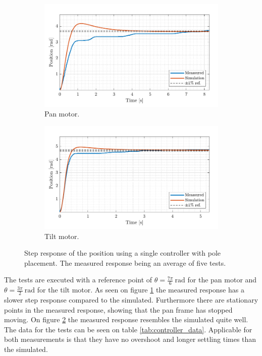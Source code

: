 \documentclass[../../main.tex]{subfiles}
\begin{document}
\begin{figure}[h]
     \centering
     \begin{subfigure}[b]{0.49\textwidth}
         \centering
         \includegraphics[width=\textwidth]{Sections/Test/Images/PoscontrollerTestPan.pdf}
         \caption{Pan motor.}
         \label{fig:StepPanPos}
     \end{subfigure}
     \hfill
     \begin{subfigure}[b]{0.49\textwidth}
         \centering
         \includegraphics[width=\textwidth]{Sections/Test/Images/PoscontrollerTestTilt.pdf}
         \caption{Tilt motor.}
         \label{fig:StepTiltPos}
     \end{subfigure}
        \caption{Step response of the position using a single controller with pole placement. The measured response being an average of five tests.}
        \label{fig:singlePosController}
\end{figure}
The tests are executed with a reference point of $\theta = \frac{7\pi}{6}\SI{}{\radian}$ for the pan motor and $\theta = \frac{3\pi}{2}\SI{}{\radian}$ for the tilt motor. As seen on figure \ref{fig:StepPanPos} the measured response has a slower step response compared to the simulated. Furthermore there are stationary points in the measured response, showing that the pan frame has stopped moving. On figure \ref{fig:StepTiltPos} the measured response resembles the simulated quite well. The data for the tests can be seen on table \ref{tab:controller_data}. Applicable for both measurements is that they have no overshoot and longer settling times than the simulated. 
\end{document}

